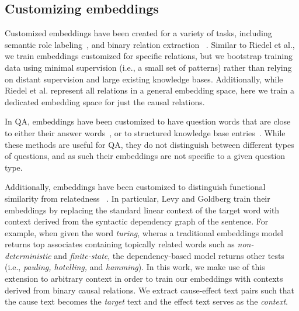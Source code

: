 \subsection{Customizing embeddings}
Customized embeddings have been created for a variety of tasks, including semantic role labeling~\cite{fitzgerald2015semantic,woodsenddistributed}, and binary relation extraction ~\mbox{\cite{riedel2013relation}.}
Similar to Riedel et al., we train embeddings customized for specific relations, but we bootstrap training data using minimal supervision (i.e., a small set of patterns) rather than relying on distant supervision and large existing knowledge bases.  Additionally, while Riedel et al. represent all relations in a general embedding space, here we train a dedicated embedding space for just the causal relations. 

In QA, embeddings have been customized to have question words that are close to either their answer words~\cite{bordes2014question}, or to structured knowledge base entries~\cite{yang2014joint}.  While these methods are useful for QA, they do not distinguish between different types of questions, and as such their embeddings are not specific to a given question type.

Additionally, embeddings have been customized to distinguish functional similarity from relatedness ~\cite{levy2014dependency,kielaspecializing}.
In particular, Levy and Goldberg train their embeddings by replacing the standard linear context of the target word with context derived from the syntactic dependency graph of the sentence.  For example, when given the word \emph{turing}, wheras a traditional embeddings model returns top associates containing topically related words such as \emph{non-deterministic} and \emph{finite-state}, the dependency-based model returns other tests (i.e., \emph{pauling, hotelling,} and \emph{hamming}).
In this work, we make use of this extension to arbitrary context in order to train our embeddings with contexts derived from binary causal relations.  We extract cause-effect text pairs such that the cause text becomes the \emph{target} text and the effect text serves as the \emph{context}. 

